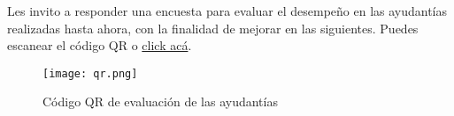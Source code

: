 \noindent Les invito a responder una encuesta para evaluar el desempeño en las ayudantías realizadas hasta ahora, con la finalidad de mejorar en las siguientes. Puedes escanear el código QR o  \href{https://forms.gle/mcJ643DcNXVB5iNu9}{click acá}.

\begin{figure}[H]
    \centering
    \texttt{[image: qr.png]}
    \caption{Código QR de evaluación de las ayudantías}
    \label{fig:qr}
\end{figure}